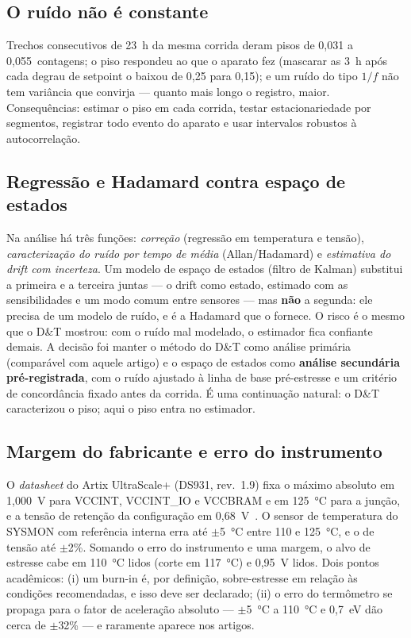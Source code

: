 \documentclass[11pt,a4paper]{article}
\begin{document}
\subsection{O ruído não é constante}

Trechos consecutivos de 23~h da mesma corrida deram pisos de 0,031 a 0,055~contagens; o piso respondeu ao que o aparato
fez (mascarar as 3~h após cada degrau de setpoint o baixou de 0,25 para 0,15); e um ruído do tipo $1/f$ não tem variância
que convirja --- quanto mais longo o registro, maior. Consequências: estimar o piso em cada corrida, testar
estacionariedade por segmentos, registrar todo evento do aparato e usar intervalos robustos à autocorrelação.

\subsection{Regressão e Hadamard contra espaço de estados}

Na análise há três funções: \emph{correção} (regressão em temperatura e tensão), \emph{caracterização do ruído por tempo de
média} (Allan/Hadamard) e \emph{estimativa do drift com incerteza}. Um modelo de espaço de estados (filtro de Kalman)
substitui a primeira e a terceira juntas --- o drift como estado, estimado com as sensibilidades e um modo comum entre
sensores --- mas \textbf{não} a segunda: ele precisa de um modelo de ruído, e é a Hadamard que o fornece. O risco é o mesmo
que o D\&T mostrou: com o ruído mal modelado, o estimador fica confiante demais. A decisão foi manter o método do D\&T
como análise primária (comparável com aquele artigo) e o espaço de estados como \textbf{análise secundária
pré-registrada}, com o ruído ajustado à linha de base pré-estresse e um critério de concordância fixado antes da corrida.
É uma continuação natural: o D\&T caracterizou o piso; aqui o piso entra no estimador.

\subsection{Margem do fabricante e erro do instrumento}

O \emph{datasheet} do Artix UltraScale+ (DS931, rev.~1.9) fixa o máximo absoluto em 1,000~V para VCCINT, VCCINT\_IO e
VCCBRAM e em 125~°C para a junção, e a tensão de retenção da configuração em 0,68~V~\cite{ds931}. O sensor de temperatura do
SYSMON com referência interna erra até $\pm$5~°C entre 110 e 125~°C, e o de tensão até $\pm$2\%. Somando o erro do
instrumento e uma margem, o alvo de estresse cabe em 110~°C lidos (corte em 117~°C) e 0,95~V lidos. Dois pontos
acadêmicos: (i) um burn-in é, por definição, sobre-estresse em relação às condições recomendadas, e isso deve ser
declarado; (ii) o erro do termômetro se propaga para o fator de aceleração absoluto --- $\pm$5~°C a 110~°C e 0,7~eV dão
cerca de $\pm$32\% --- e raramente aparece nos artigos.
\end{document}
